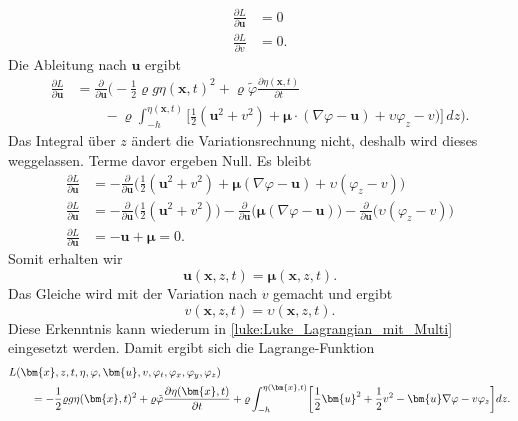 \begin{align*}
\frac{\partial L}{\partial \bm{u}} &= 0
\\
\frac{\partial L}{\partial v} &= 0.
\end{align*}
Die Ableitung nach $\bm{u}$ ergibt
\begin{align*}
\frac{\partial L}{\partial \bm{u}}
&=
\frac{\partial \mathscr{}}{\partial \bm{u}}\bigg( -\frac{1}{2} \varrho g \eta(\bm{x},t)^2
+
\varrho\tilde{\varphi} \frac{\partial\eta(\bm{x},t)}{\partial t}
\\
&\qquad
-\varrho
\int_{-h}^{\eta(\bm{x},t)}
\biggl[
\frac{1}{2} (\bm{u}^2 + v^2) + \bm{\mu} \cdot (\nabla\varphi - \bm{u}) + \upsilon \varphi_z - v)
\biggr]
\,dz\bigg).
\nonumber
\end{align*}
Das Integral über $z$ ändert die Variationsrechnung nicht, deshalb wird dieses weggelassen.
Terme davor ergeben Null.
Es bleibt
\begin{align*}
\frac{\partial L}{\partial \bm{u}}
&=
-\frac{\partial}{\partial \bm{u}}
\biggl(\frac{1}{2} (\bm{u}^2 + v^2) + \bm{\mu} (\nabla\varphi - \bm{u})
+ \upsilon (\varphi_z - v) \biggr)
\\
\frac{\partial L}{\partial \bm{u}}
&=
-\frac{\partial}{\partial \bm{u}}
\biggl( \frac{1}{2} (\bm{u}^2 + v^2) \biggr)
-\frac{\partial}{\partial \bm{u}}
\bigl( \bm{\mu} (\nabla\varphi - \bm{u}) \bigr)
-\frac{\partial}{\partial \bm{u}}
\bigl( \upsilon (\varphi_z - v)\bigr)
\\
\frac{\partial L}{\partial \bm{u}} &=
-\bm{u}
+\bm{\mu} = 0.
\end{align*}
Somit erhalten wir
\begin{equation}
	\bm{u}(\bm{x},z,t) = \bm{\mu}(\bm{x},z,t).
\end{equation}
Das Gleiche wird mit der Variation nach $v$ gemacht und ergibt
\begin{equation}
	v(\bm{x},z,t) = \upsilon(\bm{x},z,t).
\end{equation}
Diese Erkenntnis kann wiederum in \eqref{luke:Luke_Lagrangian_mit_Multi} eingesetzt werden.
Damit ergibt sich die La\-gran\-ge-Funk\-tion
\begin{align}
&L(\bm{x},z,t,\eta,\varphi,\bm{u}, v,\varphi_t,\varphi_x, \varphi_y, \varphi_z)
\notag
\\
&\qquad=
	-
	\frac{1}{2}\varrho g \eta(\bm{x},t)^2
	+
	\varrho\tilde{\varphi} \frac{\partial\eta(\bm{x},t)}{\partial t}
	+
	\varrho\int_{-h}^{\eta(\bm{x},t)} \biggl[ \frac{1}{2} \bm{u}^2 + \frac{1}{2} v^2 - \bm{u} \nabla \varphi - v \varphi_z \biggr] dz.
	\label{luke:Luke_Lagrangian_mit_Multi_verkuerzt}
\end{align}
